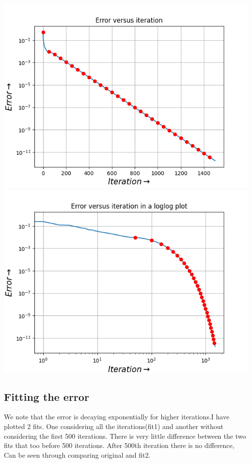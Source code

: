 \documentclass[11pt, a4paper]{article}
\begin{document}
    
     \includegraphics[scale=0.8]{Ass5_Figure_1.png} 
     \includegraphics[scale=0.8]{Ass5_Figure_2.png}  



\subsection{Fitting the error}
We note that the error is decaying exponentially for higher iterations.I have plotted 2 fits. One considering all the iterations(fit1) and another without considering the first 500 iterations. There is very little difference between the two fits that too before 500 iterations. After 500th iteration there is no difference, Can be seen through comparing original and fit2.
\end{document}
